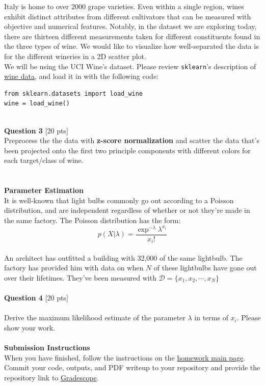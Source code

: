 \documentclass[paper=a4, fontsize=11pt]{scrartcl} %
\begin{document}
Italy is home to over 2000 grape varieties. Even within a single region, wines exhibit distinct attributes from different cultivators that can be measured with objective and numerical features. Notably, in the dataset we are exploring today, there are thirteen different measurements taken for different constituents found in the three types of wine. We would like to visualize how well-separated the data is for the different wineries in a 2D scatter plot.\\

We will be using the UCI Wine's dataset. Please review \verb"sklearn"'s description of \href{https://scikit-learn.org/stable/modules/generated/sklearn.datasets.load_wine.html}{wine data}, and load it in with the following code:
\begin{verbatim}
from sklearn.datasets import load_wine
wine = load_wine()
\end{verbatim} \\

{\Large \textbf{Question 3} [20 pts]} \\

Preprocess the the data with \textbf{z-score normalization} and scatter the data that's been projected onto the first two principle components with different colors for each target/class of wine. \\
\\
\\
{\huge \textbf{Parameter Estimation}} \\

It is well-known that light bulbs commonly go out according to a Poisson distribution, and are independent regardless of whether or not they're made in the same factory. The Poisson distribution has the form: \\
\begin{equation}
p(X | \lambda) = \frac{ \exp^{-\lambda} \lambda ^{x_i}}{ x_i !} \nonumber
\end{equation} \\

An architect has outfitted a building with 32,000 of the same lightbulb. The factory has provided him with data on when $N$ of these lightbulbs have gone out over their lifetimes. They've been measured with $\mathcal{D} = \{ x_1, x_2, \cdots, x_N \}$\\
\\
{\Large \textbf{Question 4} [20 pts]} \\
\\
Derive the maximum likelihood estimate of the parameter $\lambda$ in terms of $x_i$. Please show your work. \\
\\


{\huge \textbf{Submission Instructions}} \\

When you have finished, follow the instructions on the \href{https://course.ccs.neu.edu/cs6220/homework-3/}{ homework main page}. Commit your code, outputs, and PDF writeup to your repository and provide the repository link to \href{https://www.gradescope.com}{Gradescope}.
\end{document}
